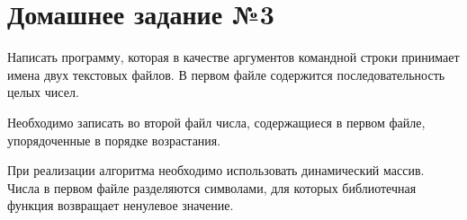 \section*{Домашнее задание №3}


Написать программу, которая в качестве аргументов командной строки
принимает имена двух текстовых файлов. В первом файле содержится
последовательность целых чисел.

Необходимо записать во второй файл
числа, содержащиеся в первом файле, упорядоченные в порядке
возрастания.

При реализации алгоритма необходимо использовать
динамический массив. Числа в первом файле разделяются символами, для
которых библиотечная функция  возвращает ненулевое значение.
